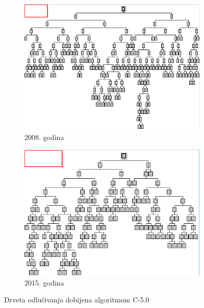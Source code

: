 \documentclass[a4paper]{article}
\begin{document}
\begin{figure}[H]
	\vspace{0.5cm}
	\begin{subfigure}[h]{\textwidth}
		\begin{center}
			\includegraphics[scale=0.70]{Klasifikacija/C50/MapaDrvetaOdlucivanja2008.png}
		\end{center}
		\caption{2008. godina}
		\label{fig:DrvoOdlucivanjaC502008}
	\end{subfigure}
	
	\vspace{0.5cm}
	\begin{subfigure}[h]{\textwidth}
		\begin{center}
			\includegraphics[scale=0.70]{Klasifikacija/C50/MapaDrvetaOdlucivanja2015.png}
		\end{center}
		\caption{2015. godina}
		\label{fig:DrvoOdlucivanjaC502015}
	\end{subfigure}
	
	\caption{Drveta odlučivanja dobijena algoritmom C-5.0}
	\label{fig:DrvoOdlucivanjaC50}
\end{figure}
\end{document}
